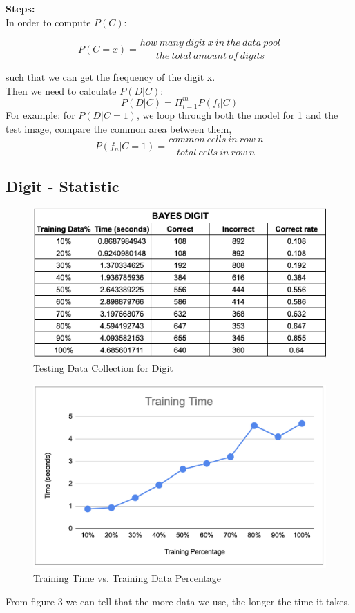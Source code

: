 \documentclass[11pt]{report}
\begin{document}
\textbf{Steps:} \\

In order to compute $P(C)$:

$$P(C = x) = \frac{how\ many\ digit\ x\ in\ the\ data\ pool}{the\ total\ amount\ of\ digits}$$

such that we can get the frequency of the digit x. \\


Then we need to calculate $P(D|C)$: \\
$$P(D|C) = \Pi_{i=1}^m P(f_i|C)$$
For example: for $P(D|C=1)$, we loop through both the model for 1 and the test image, compare the common area between them,
$$P(f_n|C = 1) = \frac{common\ cells\ in\ row\ n}{total\ cells\ in\ row\ n}$$

\subsection*{Digit - Statistic}

\begin{figure}[h]
\begin{center}
\includegraphics[scale=0.5]{Bayes_digit_statistic.png} 
\end{center}
\caption{Testing Data Collection for Digit}
\end{figure}
\newpage


\begin{figure}[]
\begin{center}
\includegraphics[scale=0.45]{Bayes_digit_traintime.png} 
\end{center}
\caption{Training Time vs. Training Data Percentage}
\end{figure}
From figure 3 we can tell that the more data we use, the longer the time it takes.\\
\end{document}
